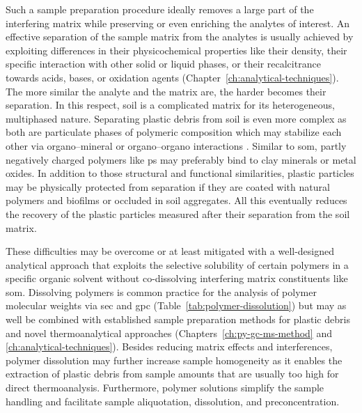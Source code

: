 Such a sample preparation procedure ideally removes a large part of the interfering matrix while preserving or even enriching the analytes of interest.
An effective separation of the sample matrix from the analytes is usually achieved by exploiting differences in their physicochemical properties like their density, their specific interaction with other solid or liquid phases, or their recalcitrance towards acids, bases, or oxidation agents (Chapter~\ref{ch:analytical-techniques}). The more similar the analyte and the matrix are, the harder becomes their separation.
In this respect, soil is a complicated matrix for its heterogeneous, multiphased nature. Separating plastic debris from soil is even more complex as both are particulate phases of polymeric composition which may stabilize each other via organo--mineral or organo--organo interactions \citep{LuoDistribution2020,SchaumannSoil2006}. Similar to \ac{som}, partly negatively charged polymers like \ac{ps} may preferably bind to clay minerals or metal oxides. In addition to those structural and functional similarities, plastic particles may be physically protected from separation if they are coated with natural polymers and biofilms or occluded in soil aggregates. All this eventually reduces the recovery of the plastic particles measured after their separation from the soil matrix.

These difficulties may be overcome or at least mitigated with a well-designed analytical approach that exploits the selective solubility of certain polymers in a specific organic solvent without co-dissolving interfering matrix constituents like \ac{som}. Dissolving polymers is common practice for the analysis of polymer molecular weights via \ac{sec} and \ac{gpc} (Table~\ref{tab:polymer-dissolution}) but may as well be combined with established sample preparation methods for plastic debris and novel thermoanalytical approaches (Chapters~\ref{ch:py-gc-ms-method} and \ref{ch:analytical-techniques}). Besides reducing matrix effects and interferences, polymer dissolution may further increase sample homogeneity as it enables the extraction of plastic debris from sample amounts that are usually too high for direct thermoanalysis. Furthermore, polymer solutions simplify the sample handling and facilitate sample aliquotation, dissolution, and preconcentration.

